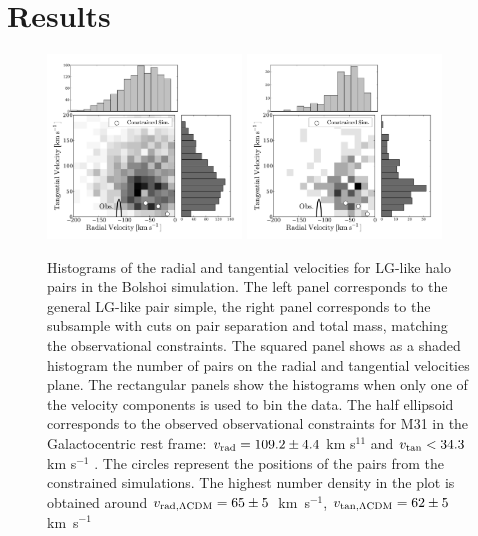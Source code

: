 \documentclass{emulateapj}
\newcommand{\kms}{\,km~s$^{-1}$}
\begin{document}
\section{Results}
\label{sec:results}



\begin{figure}
\begin{center}
\includegraphics[keepaspectratio=true,width=0.46\textwidth]{./figures/test_rt.pdf}
\includegraphics[keepaspectratio=true,width=0.46\textwidth]{./figures/test_rt_narrow.pdf}
\caption{Histograms of the radial and tangential velocities for LG-like halo pairs in the Bolshoi simulation. The left panel corresponds to the general LG-like pair simple, the right panel corresponds to the subsample with cuts on pair separation and total mass, matching the observational constraints. The squared panel shows as a shaded histogram the number of pairs on the radial and tangential velocities plane. The rectangular panels show the histograms when only one of the velocity components is used to bin the data. The half ellipsoid corresponds to the observed observational constraints for M31 in the Galactocentric rest frame: $v_{\rm rad}=109.2\pm 4.4$ km s$^{11}$ and $v_{\rm tan}< 34.3$ km s$^{-1}$ \citep{vanderMarel12}. The circles represent the positions of the pairs from the constrained simulations. The highest number density in the plot is obtained around $v_{\rm rad,\Lambda CDM} = 65\pm5$ \kms, $v_{\rm tan,\Lambda CDM} = 62\pm5$ \kms}
\label{fig:rt}
\end{center}

\end{figure}
\end{document}
